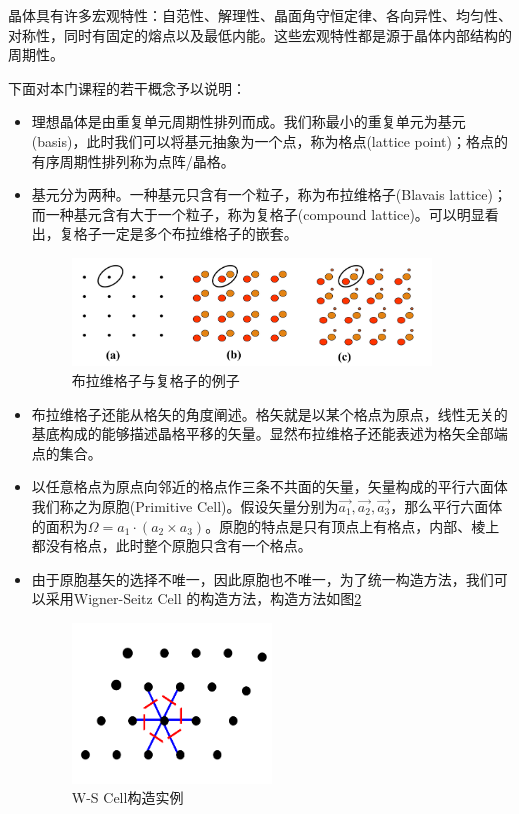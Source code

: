 \documentclass{ctexart}
\begin{document}
晶体具有许多宏观特性：自范性、解理性、晶面角守恒定律、各向异性、均匀性、对称性，同时有固定的熔点以及最低内能。这些宏观特性都是源于晶体内部结构的周期性。

下面对本门课程的若干概念予以说明：
\begin{itemize}
    \item 理想晶体是由重复单元周期性排列而成。我们称最小的重复单元为基元(basis)，此时我们可以将基元抽象为一个点，称为格点(lattice point)；格点的有序周期性排列称为点阵/晶格。
    \item 基元分为两种。一种基元只含有一个粒子，称为布拉维格子(Blavais lattice)；而一种基元含有大于一个粒子，称为复格子(compound lattice)。可以明显看出，复格子一定是多个布拉维格子的嵌套。
    
        \begin{figure}[H]
        \centering
        \includegraphics[width=0.9\textwidth]{figure/lattice.png}
        \caption{布拉维格子与复格子的例子}
        \label{fig:lattice}
    \end{figure}

    \item 布拉维格子还能从格矢的角度阐述。格矢就是以某个格点为原点，线性无关的基底构成的能够描述晶格平移的矢量。显然布拉维格子还能表述为格矢全部端点的集合。
    \item 以任意格点为原点向邻近的格点作三条不共面的矢量，矢量构成的平行六面体我们称之为原胞(Primitive Cell)。假设矢量分别为$\Vec{a_1},\Vec{a_2},\Vec{a_3}$，那么平行六面体的面积为$\Omega=a_1\cdot(a_2\times a_3)$。原胞的特点是只有顶点上有格点，内部、棱上都没有格点，此时整个原胞只含有一个格点。
    \item 由于原胞基矢的选择不唯一，因此原胞也不唯一，为了统一构造方法，我们可以采用Wigner-Seitz Cell 的构造方法，构造方法如图\ref{fig:W-S Cell}
    
        \begin{figure}[H]
        \centering
        \includegraphics[width=0.5\textwidth]{figure/W-S Cell.png}
        \caption{W-S Cell构造实例}
        \label{fig:W-S Cell}
    \end{figure}
    

\end{itemize}
\end{document}
